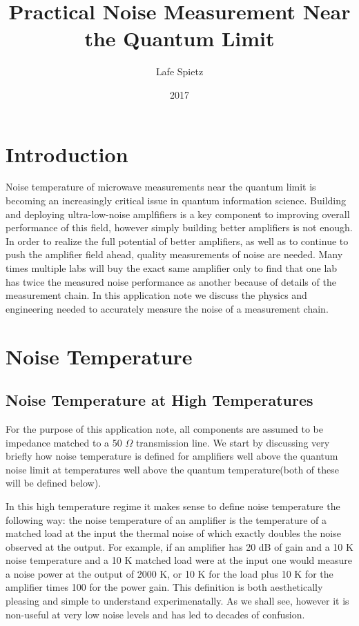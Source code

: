 \documentclass{report}
\begin{document}
\title{Practical Noise Measurement Near the Quantum Limit}
\author{Lafe Spietz}
\date{2017}
\maketitle

\section{Introduction}
	Noise temperature of microwave measurements near the quantum limit is becoming an increasingly critical issue in quantum information science.  Building and deploying ultra-low-noise amplfifiers is a key component to improving overall performance of this field, however simply building better amplifiers is not enough.  In order to realize the full potential of better amplifiers, as well as to continue to push the amplifier field ahead, quality measurements of noise are needed.   Many times multiple labs will buy the exact same amplifier only to find that one lab has twice the measured noise performance as another because of details of the measurement chain.  In this application note we discuss the physics and engineering needed to accurately measure the noise of a measurement chain.

\section{Noise Temperature}
	\subsection{Noise Temperature at High Temperatures}
		For the purpose of this application note, all components are assumed to be impedance matched to a 50 $\Omega$ transmission line.  We start by discussing very briefly how noise temperature is defined for amplifiers well above the quantum noise limit at temperatures well above the quantum temperature(both of these will be defined below). 

	In this high temperature regime it makes sense to define noise temperature the following way:  the noise temperature of an amplifier is the temperature of a matched load at the input the thermal noise of which exactly doubles the noise observed at the output.  For example, if an amplifier has 20 dB of gain and a 10 K noise temperature and a 10 K matched load were at the input one would measure a noise power at the output of 2000 K, or 10 K for the load plus 10 K for the amplifier times 100 for the power gain.  This definition is both aesthetically pleasing and simple to understand experimenatally.  As we shall see, however it is non-useful at very low noise levels and has led to decades of confusion.  
\end{document}
